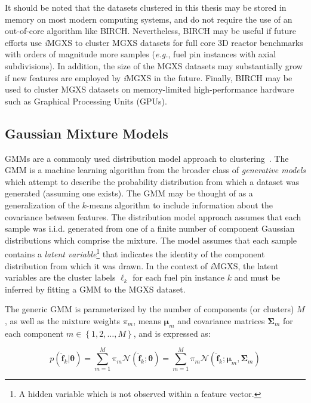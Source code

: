 It should be noted that the datasets clustered in this thesis may be stored in memory on most modern computing systems, and do not require the use of an out-of-core algorithm like BIRCH. Nevertheless, BIRCH may be useful if future efforts use \textit{i}\ac{MGXS} to cluster \ac{MGXS} datasets for full core 3D reactor benchmarks with orders of magnitude more samples (\textit{e.g.}, fuel pin instances with axial subdivisions). In addition, the size of the \ac{MGXS} datasets may substantially grow if new features are employed by \textit{i}\ac{MGXS} in the future. Finally, BIRCH may be used to cluster \ac{MGXS} datasets on memory-limited high-performance hardware such as Graphical Processing Units (GPUs).

\subsection{Gaussian Mixture Models}
\label{subsec:chap10-gmms}

\acp{GMM} are a commonly used distribution model approach to clustering~\cite{mclachlan1988mixture}. The \ac{GMM} is a machine learning algorithm from the broader class of \textit{generative models} which attempt to describe the probability distribution from which a dataset was generated (assuming one exists). The \ac{GMM} may be thought of as a generalization of the $k$-means algorithm to include information about the covariance between features. The distribution model approach assumes that each sample was i.i.d. generated from one of a finite number of component Gaussian distributions which comprise the mixture. The model assumes that each sample contains a \textit{latent variable}\footnote{A hidden variable which is not observed within a feature vector.} that indicates the identity of the component distribution from which it was drawn. In the context of \textit{i}\ac{MGXS}, the latent variables are the cluster labels $\ell_{k}$ for each fuel pin instance $k$ and must be inferred by fitting a \ac{GMM} to the \ac{MGXS} dataset.

The generic \ac{GMM} is parameterized by the number of components (or clusters) $M$, as well as the mixture weights $\pi_{m}$, means $\boldsymbol{\mu}_{m}$ and covariance matrices $\boldsymbol{\Sigma}_{m}$ for each component $m \in \left\{ 1, 2, \dots, M \right\}$, and is expressed as:

\begin{equation}
\label{eqn:chap10-gmm}
p\left(\boldsymbol{\hat{f}}_{k} | \boldsymbol{\theta}\right) = \displaystyle\sum\limits_{m=1}^{M} \pi_{m} \mathcal{N}\left(\boldsymbol{\hat{f}}_{k}; \boldsymbol{\theta}\right) = \displaystyle\sum\limits_{m=1}^{M} \pi_{m} \mathcal{N}\left(\boldsymbol{\hat{f}}_{k}; \boldsymbol{\mu}_{m}, \boldsymbol{\Sigma}_{m}\right)
\end{equation}

